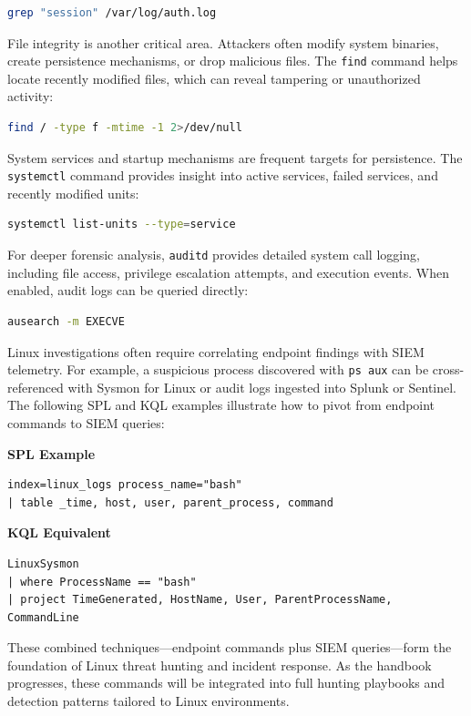\begin{lstlisting}[language=bash]
grep "session" /var/log/auth.log
\end{lstlisting}

File integrity is another critical area. Attackers often modify system binaries, create persistence mechanisms, or drop malicious files. The \texttt{find} command helps locate recently modified files, which can reveal tampering or unauthorized activity:

\begin{lstlisting}[language=bash]
find / -type f -mtime -1 2>/dev/null
\end{lstlisting}

System services and startup mechanisms are frequent targets for persistence. The \texttt{systemctl} command provides insight into active services, failed services, and recently modified units:

\begin{lstlisting}[language=bash]
systemctl list-units --type=service
\end{lstlisting}

For deeper forensic analysis, \texttt{auditd} provides detailed system call logging, including file access, privilege escalation attempts, and execution events. When enabled, audit logs can be queried directly:

\begin{lstlisting}[language=bash]
ausearch -m EXECVE
\end{lstlisting}

Linux investigations often require correlating endpoint findings with SIEM telemetry. For example, a suspicious process discovered with \texttt{ps aux} can be cross-referenced with Sysmon for Linux or audit logs ingested into Splunk or Sentinel. The following SPL and KQL examples illustrate how to pivot from endpoint commands to SIEM queries:

\textbf{SPL Example}
\begin{lstlisting}
index=linux_logs process_name="bash"
| table _time, host, user, parent_process, command
\end{lstlisting}

\textbf{KQL Equivalent}
\begin{lstlisting}
LinuxSysmon
| where ProcessName == "bash"
| project TimeGenerated, HostName, User, ParentProcessName, CommandLine
\end{lstlisting}

These combined techniques—endpoint commands plus SIEM queries—form the foundation of Linux threat hunting and incident response. As the handbook progresses, these commands will be integrated into full hunting playbooks and detection patterns tailored to Linux environments.
